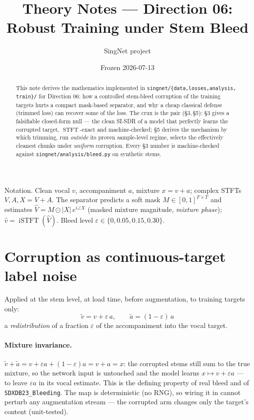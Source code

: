 \documentclass[11pt]{article}
\title{Theory Notes --- Direction 06:\\
Robust Training under Stem Bleed}
\author{SingNet project}
\date{Frozen 2026-07-13}
\newcommand{\code}[1]{\texttt{#1}}
\DeclareMathOperator{\STFT}{STFT}
\DeclareMathOperator{\iSTFT}{iSTFT}
\newcommand{\eps}{\varepsilon}
\newcommand{\vt}{\tilde v}
\newcommand{\at}{\tilde a}
\begin{document}
\maketitle

\begin{abstract}
This note derives the mathematics implemented in \code{singnet/\{data,losses,analysis,
train\}/} for Direction 06: how a controlled stem-bleed corruption of the training
targets hurts a compact mask-based separator, and why a cheap classical defense (trimmed
loss) can recover some of the loss. The crux is the pair (\S3,\,\S5): \S3 gives a
falsifiable closed-form null --- the clean SI-SDR of a model that perfectly learns the
corrupted target, $\STFT$-exact and machine-checked; \S5 derives the mechanism by which
trimming, run \emph{outside} its proven sample-level regime, selects the effectively
cleanest chunks under \emph{uniform} corruption. Every \S3 number is machine-checked
against \code{singnet/analysis/bleed.py} on synthetic stems.
\end{abstract}

Notation. Clean vocal $v$, accompaniment $a$, mixture $x=v+a$; complex STFTs $V,A,X=V+A$.
The separator predicts a soft mask $M\in[0,1]^{F\times T}$ and estimates
$\widehat V=M\odot|X|\,e^{i\angle X}$ (masked mixture magnitude, \emph{mixture phase});
$\hat v=\iSTFT(\widehat V)$. Bleed level $\eps\in\{0,0.05,0.15,0.30\}$.

\section{Corruption as continuous-target label noise}

Applied at the stem level, at load time, before augmentation, to training targets only:
\begin{equation}
\boxed{\ \vt = v + \eps\,a,\qquad \at = (1-\eps)\,a\ }
\end{equation}
a \emph{redistribution} of a fraction $\eps$ of the accompaniment into the vocal target.

\paragraph{Mixture invariance.} $\vt+\at = v+\eps a+(1-\eps)a = v+a = x$: the corrupted
stems still sum to the true mixture, so the network input is untouched and the model learns
$x\mapsto v+\eps a$ --- to leave $\eps a$ in its vocal estimate. This is the defining
property of real bleed and of \code{SDXDB23\_Bleeding}. The map is deterministic (no RNG),
so wiring it in cannot perturb any augmentation stream --- the corrupted arm changes only
the target's content (unit-tested).
\end{document}
